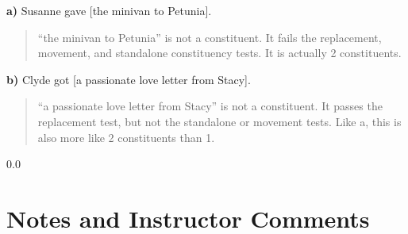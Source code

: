\documentclass[11pt,notitlepage]{article}
\newcommand{\subquestion}[2]{\par\hspace{0.5cm} \textbf{#1)} #2}
\begin{document}
\subquestion{a}{Susanne gave [the minivan to Petunia].}

\begin{quote}
  ``the minivan to Petunia'' is not a constituent. It fails the
  replacement, movement, and standalone constituency tests. It is
  actually 2 constituents.
\end{quote}

\subquestion{b}{Clyde got [a passionate love letter from Stacy].}

\begin{quote}
  ``a passionate love letter from Stacy'' is not a constituent. It passes
  the replacement test, but not the standalone or movement tests. Like
  a, this is also more like 2 constituents than 1.
\end{quote}

\newpage
  {\setlength{\baselineskip}%
           {0.0\baselineskip}
  \section*{Notes and Instructor Comments}
  \hrulefill \par}
\end{document}
